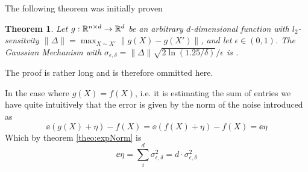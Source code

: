 \documentclass[a4paper,12pt]{article}
\newtheorem{theorem}{Theorem}
\begin{document}
The following theorem was initially proven
\begin{theorem}\textnormal{\cite{dpbasic}}
\label{theo:gaussMech}
Let $g: \mathbb{R}^{n \times d} \rightarrow \mathbb{R}^{d}$ be an arbitrary 
$d$-dimensional function with $l_2$-sensitvity 
$\| \Delta \| = \max_{X \sim X'} \| g(X) - g(X') \|$, 
and let $\epsilon \in (0,1)$.
The Gaussian Mechanism with
$\sigma_{\epsilon, \delta} = \| \Delta \| \sqrt{2\ln(1.25/\delta)}/\epsilon$ 
is \edp.
\end{theorem}
The proof is rather long and is therefore ommitted here.

In the case where $g(X) = f(X)$, i.e. it is estimating the sum
of entries we have quite intuitively that the error is given by 
the norm of the noise introduced as
\[
    \ee{(g(X) + \eta) - f(X)} =
    \ee{(f(X) + \eta) - f(X)} = 
    \ee{\eta}
\]
Which by theorem \ref{theo:expNorm} is 
\[
    \ee{\eta} = \sum_i^d \sigma_{\epsilon,\delta}^2 = d \cdot \sigma_{\epsilon,\delta}^2
\]



\end{document}
